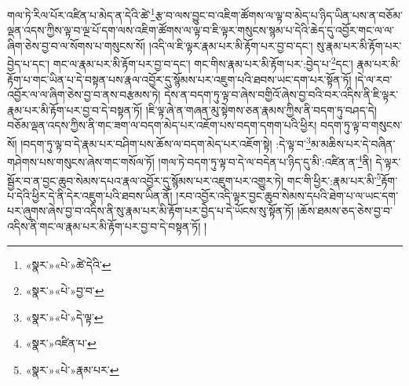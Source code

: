 གལ་ཏེ་རིལ་པོར་འཛིན་པ་མེད་ན་དེའི་ཚེ་\footnote{«སྣར་»«པེ་»ཚེ་དེའི་}རྩ་བ་ལས་བྱུང་བ་འཇིག་ཚོགས་ལ་ལྟ་བ་མེད་པ་ཉིད་ཡིན་པས་ན་བཅོམ་ལྡན་འདས་ཀྱིས་ལྟ་བ་ལྔ་པོ་དག་ལས་འཇིག་ཚོགས་ལ་ལྟ་བ་ཇི་ལྟར་གསུངས་སྙམ་པ་དེའི་ཆེད་དུ་འབྱོར་གང་ལ་ལ་ཞིག་ཅེས་བྱ་བ་ལ་སོགས་པ་གསུངས་སོ། །འདི་ལ་ཇི་ལྟར་རྣམ་པར་མི་རྟོག་པར་བྱ་བ་དང་། སུ་རྣམ་པར་མི་རྟོག་པར་བྱེད་པ་དང་། གང་ལ་རྣམ་པར་མི་རྟོག་པར་བྱ་བ་དང་། གང་གིས་རྣམ་པར་མི་རྟོག་པར་:བྱེད་པ་\footnote{«སྣར་»«པེ་»བྱ་བ་}དང་། རྣམ་པར་མི་རྟོག་པ་གང་ཡིན་པ་དེ་བསྟན་པས་རྣལ་འབྱོར་དུ་སྙོམས་པར་འཇུག་པའི་ཐབས་ཡང་དག་པར་སྟོན་ཏོ། །དེ་ལ་རབ་འབྱོར་ལ་ལ་ཞིག་ཅེས་བྱ་བ་ནས་བརྩམས་ཏེ། དེས་ན་བདག་ཏུ་ལྟ་བ་ཞེས་བགྱིའོ་ཞེས་བྱ་བའི་བར་འདིས་ནི་ཇི་ལྟར་རྣམ་པར་མི་རྟོག་པར་བྱ་བ་དེ་བསྟན་ཏོ། །ཇི་ལྟ་ཞེ་ན་གཞན་མུ་སྟེགས་ཅན་རྣམས་ཀྱིས་ནི་བདག་ཏུ་བཤད་དེ། བཅོམ་ལྡན་འདས་ཀྱིས་ནི་གང་ཟག་ལ་བདག་མེད་པར་འཇོག་པས་བདག་དགག་པའི་ཕྱིར། བདག་ཏུ་ལྟ་བ་གསུངས་སོ། །བདག་ཏུ་ལྟ་བ་དེ་རྣམ་པར་བཤིག་པས་ཆོས་ལ་བདག་མེད་པར་འཇོག་སྟེ། :དེ་ལྟ་བ་\footnote{«སྣར་»«པེ་»དེ་ལྟ་}མ་མཆིས་པར་དེ་བཞིན་གཤེགས་པས་གསུངས་ཞེས་གང་གསོལ་ཏོ། །གལ་ཏེ་བདག་ཏུ་ལྟ་བ་དེ་ལ་བདེན་པ་ཉིད་དུ་མི་:འཛིན་ན་\footnote{«སྣར་»འཛིན་པ་}ནི། དེ་ལྟར་སྦྱོར་བ་ན་བྱང་ཆུབ་སེམས་དཔའ་རྣལ་འབྱོར་དུ་སྙོམས་པར་འཇུག་པར་འགྱུར་ཏེ། གང་གི་ཕྱིར་:རྣམ་པར་མི་\footnote{«སྣར་»«པེ་»རྣམ་པར་}རྟོག་པ་དེའི་ཕྱིར་དེ་ནི་དེར་འཇུག་པའི་ཐབས་ཡིན་ནོ། །རབ་འབྱོར་འདི་ལྟར་བྱང་ཆུབ་སེམས་དཔའི་ཐེག་པ་ལ་ཡང་དག་པར་ཞུགས་ཞེས་བྱ་བ་འདིས་ནི་སུ་རྣམ་པར་མི་རྟོག་པར་བྱེད་པ་དེ་ཡོངས་སུ་སྟོན་ཏོ། །ཆོས་ཐམས་ཅད་ཅེས་བྱ་བ་འདིས་ནི་གང་ལ་རྣམ་པར་མི་རྟོག་པར་བྱ་བ་དེ་བསྟན་ཏོ། །
